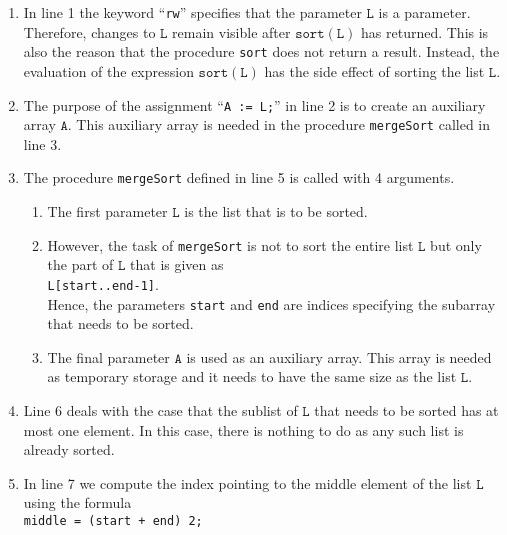 \begin{enumerate}
\item In line 1 the keyword ``\texttt{rw}'' specifies that the parameter $\mathtt{L}$ is a
       parameter.  Therefore, changes to $\mathtt{L}$ remain
      visible after $\texttt{sort}(\mathtt{L})$ has returned.  This is also the reason that the procedure 
      \texttt{sort} does not return a result.  Instead, the evaluation of the expression
      $\mathtt{sort}(\mathtt{L})$ has the side effect of sorting the list $\mathtt{L}$.
\item The purpose of the assignment ``\texttt{A := L;}'' in line 2 is to create an auxiliary array
      $\texttt{A}$.  This auxiliary array is needed in the procedure
      \texttt{mergeSort} called in line 3.
\item The procedure \texttt{mergeSort} defined in line 5 is called with 4 arguments.
      \begin{enumerate}
      \item The first parameter $\texttt{L}$ is the list that is to be sorted.
      \item However, the task of \texttt{mergeSort} is not to sort the entire list $\texttt{L}$ but only
            the part of $\texttt{L}$ that is given as
            \\[0.2cm]
            \hspace*{1.3cm} 
            \texttt{L[start..end-1]}. 
            \\[0.2cm]
            Hence, the parameters \texttt{start} and \texttt{end} are indices specifying the 
            subarray that needs to be sorted.
      \item The final parameter $\texttt{A}$ is used as an auxiliary array.  This array is needed
            as temporary storage and it needs to have the same size as the list $\texttt{L}$.
      \end{enumerate} 
\item Line 6 deals with the case that the sublist of $\texttt{L}$ that needs to be sorted has at most one element.  
      In this case, there is nothing to do as any such list is already sorted.
\item In line 7 we compute the index pointing to the middle element of the list $\texttt{L}$ using the
      formula \\[0.2cm]
      \hspace*{1.3cm} 
      \texttt{middle = (start + end)  2;} 
      \\[0.2cm]

\end{enumerate}
